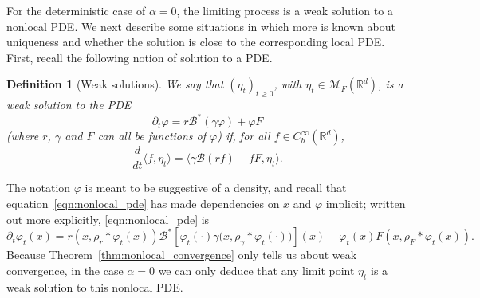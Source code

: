 \documentclass[12pt]{article}
\newtheorem{definition}[theorem]{Definition}
\newcommand{\IR}{\mathbb R}
\newcommand{\DG}{\mathcal{B}}  %
\newcommand{\kernel}{\rho}  %
\newcommand{\smooth}[1]{\kernel_{#1} \! * \!}  %
\newcommand{\measures}{\mathcal{M}_F(\IR^d)} %
\numberwithin{equation}{section}
\begin{document}
For the deterministic case of $\alpha=0$,
the limiting process is a weak solution to a nonlocal PDE.
We next describe some situations in which more is known
about uniqueness and whether the solution is close to the corresponding local PDE.
First, recall the following notion of solution to a PDE.
\begin{definition}[Weak solutions]
    \label{defn:weak_solutions}
    We say that $(\eta_t)_{t \ge 0}$, with $\eta_t \in \measures$,
    is a \emph{weak solution} to the PDE
    \begin{equation} \label{eqn:nonlocal_pde}
        \partial_t \varphi = r \DG^*(\gamma \varphi) + \varphi F
    \end{equation}
	(where $r$, $\gamma$ and $F$ can all be functions of $\varphi$)
    if, for all $f \in C_b^\infty(\IR^d)$,
    \[
        \frac{d}{dt} \langle f, \eta_t \rangle
        =
        \langle
	    \gamma \DG(rf) + f F,
            \eta_t
        \rangle .
    \]
\end{definition}
The notation $\varphi$ is meant to be suggestive of a density,
and recall that equation~\eqref{eqn:nonlocal_pde} has made dependencies on $x$ and $\varphi$ implicit;
written out more explicitly, \eqref{eqn:nonlocal_pde} is
\[
    \partial_t \varphi_t(x)
    =
    r\left(x, \smooth{r} \varphi_t(x) \right)
    \DG^* \left[
        \varphi_t(\cdot)
        \gamma\big( x, \smooth{\gamma} \varphi_t(\cdot) \big)
    \right](x)
    +
    \varphi_t(x)
    F\left(x, \smooth{F} \varphi_t(x) \right)
    .
\]
Because Theorem~\ref{thm:nonlocal_convergence} only tells us about 
weak convergence, in the case $\alpha=0$ we can only deduce that 
any limit point $\eta_t$ is a weak solution to this nonlocal PDE.
\end{document}
